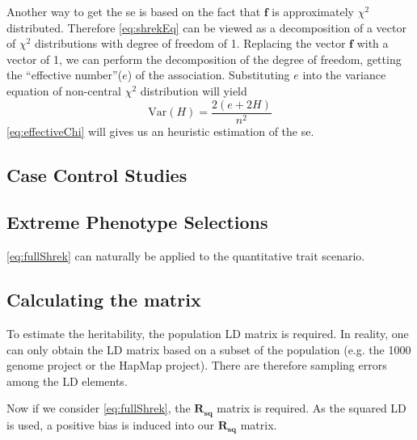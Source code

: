 			Another way to get the \gls{se} is based on the fact that $\boldsymbol{f}$ is approximately $\chi^2$ distributed. 
			Therefore \cref{eq:shrekEq} can be viewed as a decomposition of a vector of $\chi^2$ distributions with degree of freedom of 1. 
			Replacing the vector $\boldsymbol{f}$ with a vector of 1, we can perform the decomposition of the degree of freedom, getting the ``effective number''($e$) of the association\citep{Li2011}. 
			Substituting $e$ into the variance equation of non-central $\chi^2$ distribution will yield
			\begin{equation}
			\mathrm{Var}(H) = \frac{2(e+2H)}{n^2}
			\label{eq:effectiveChi}
			\end{equation}
			 \cref{eq:effectiveChi} will gives us an heuristic estimation of the \gls{se}. 
		\subsection{Case Control Studies}	 
		\subsection{Extreme Phenotype Selections}
		\cref{eq:fullShrek} can naturally be applied to the quantitative trait scenario. 
		\subsection{Calculating the  matrix}
			To estimate the heritability, the population \gls{LD} matrix is required.
			In reality, one can only obtain the \gls{LD} matrix based on a subset of the population (e.g. the 1000 genome project\citep{Project2012} or the HapMap project\citep{Altshuler2010}).
			There are therefore sampling errors among the \gls{LD} elements. 
			
			Now if we consider \cref{eq:fullShrek}, the $\boldsymbol{R_{sq}}$ matrix is required.
			As the squared \gls{LD} is used, a positive bias is induced into our $\boldsymbol{R_{sq}}$ matrix. 
			
